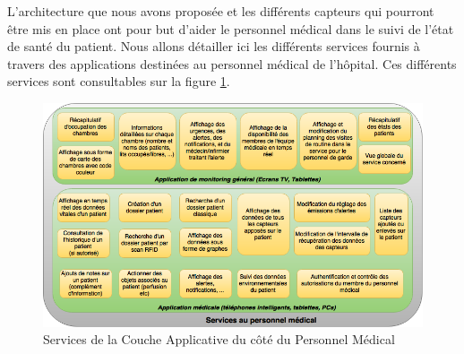 L’architecture que nous avons proposée et les différents capteurs qui pourront être mis en place ont pour but d’aider le personnel médical dans le suivi de l’état de santé du patient. Nous allons détailler ici les différents services fournis à travers des applications destinées au personnel médical de l’hôpital. Ces différents services sont consultables sur la figure \ref{medical}.
\\
\begin{figure}[h!]
	\hspace*{-2.5cm}
	\centering
	\includegraphics[width=1.4\textwidth]{medical.png}
	\caption{Services de la Couche Applicative du côté du Personnel Médical}
	\label{medical}
\end{figure}

